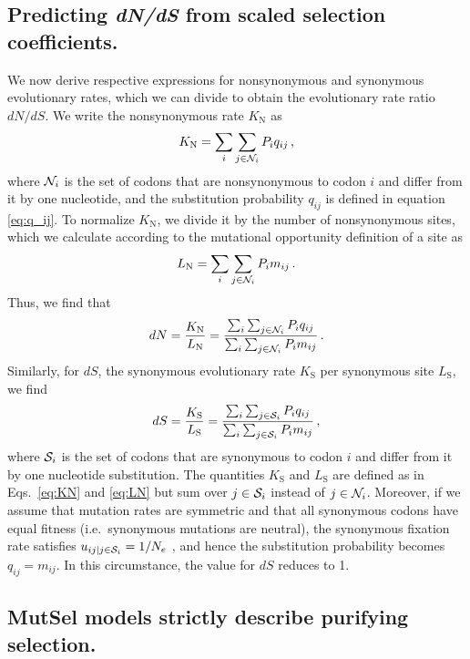 \documentclass[11pt]{article}
\begin{document}
		
\subsection*{Predicting \emph{dN/dS} from scaled selection coefficients.} 

We now derive respective expressions for nonsynonymous and synonymous evolutionary rates, which we can divide to obtain the evolutionary rate ratio $dN/dS$. We write the nonsynonymous rate $K_\text{N}$ as 
\begin{equation}\label{eq:KN}
	K_\text{N} = \sum_i \sum_{j \in {\cal N}_i} P_i q_{ij} \,,
\end{equation}
where ${\cal N}_i$ is the set of codons that are nonsynonymous to codon $i$ and differ from it by one nucleotide, and the substitution probability $q_{ij}$ is defined in equation \eqref{eq:q_ij}. To normalize $K_\text{N}$, we divide it by the number of nonsynonymous sites, which we calculate according to the mutational opportunity definition of a site \citep{GoldmanYang1994, Yang2006} as 
\begin{equation}\label{eq:LN}
	L_\text{N} = \sum_i \sum_{j \in {\cal N}_i} P_i m_{ij}\, .
\end{equation} Thus, we find that 
\begin{equation}\label{eq:dN}
	dN = \frac{K_\text{N}}{L_\text{N}}=\frac{\sum_i \sum_{j \in {\cal N}_i} P_i q_{ij}} {\sum_i \sum_{j \in {\cal N}_i}P_i m_{ij}}\,.
\end{equation} Similarly, for $dS$, the synonymous evolutionary rate $K_\text{S}$ per synonymous site $L_\text{S}$, we find
\begin{equation}\label{eq:dS}
	dS = \frac{K_\text{S}}{L_\text{S}}=\frac{\sum_i \sum_{j \in {\cal S}_i} P_i q_{ij} } {\sum_i \sum_{j \in {\cal S}_i} P_i m_{ij} }\,,
\end{equation}
where ${\cal S}_i$ is the set of codons that are synonymous to codon $i$ and differ from it by one nucleotide substitution. The quantities $K_\text{S}$ and $L_\text{S}$ are defined as in Eqs.~\eqref{eq:KN} and \eqref{eq:LN} but sum over $j\in {\cal S}_i$ instead of $j\in {\cal N}_i$. Moreover, if we assume that mutation rates are symmetric and that all synonymous codons have equal fitness (i.e.\ synonymous mutations are neutral), the synonymous fixation rate satisfies $u_{ij | j \in {\cal S}_i} = 1/N_e$ \citep{CrowKimura1970}, and hence the substitution probability becomes $q_{ij} = m_{ij}$. In this circumstance, the value for $dS$ reduces to 1.
		
				
\subsection*{MutSel models strictly describe purifying selection.}
\end{document}
